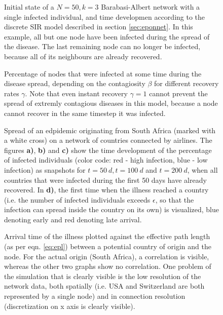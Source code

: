 \documentclass{scrartcl}
\begin{document}
\begin{figure}
    \centering
    \def\svgwidth{0.9\textwidth}
    
    \caption{Initial state of a $N=50, k=3$ Barabasi-Albert network with a single infected individual, and time developmen according to the discrete SIR model described in section \ref{sec:eponnet}. In this example, all but one node have been infected during the spread of the disease. The last remaining node can no longer be infected, because all of its neighbours are already recovered.}
    \label{fig:D11}
\end{figure}

\begin{figure}
    \centering
    \caption{Percentage of nodes that were infected at some time during the disease spread, 
		depending on the contagiosity $\beta$ for different recovery rates $\gamma$. Note that 
		even instant recovery $\gamma=1$ cannot prevent the spread of extremly contagious diseases
		in this model, because a node cannot recover in the same timestep it was infected.}
    \label{fig:D12}
\end{figure}

\begin{figure}
    \centering
    \def\svgwidth{1.0\textwidth}
    
    \caption{Spread of an edpidemic originating from South Africa (marked with a white cross) on a network of countries connected by airlines. The figures \textbf{a)}, \textbf{b)} and \textbf{c)} show the time development of the percentage of infected individuals (color code: red - high infection, blue - low infection) as snapshots for $t=\SI{50}{d}, t=\SI{100}{d}$ and $t=\SI{200}{d}$, when all countries that were infected during the first 50 days have already recovered.
		In \textbf{d)}, the first time when the illness reached a country (i.e. the number of infected individuals exceeds $\epsilon$, so that the infection can spread inside the country on its own) is visualized, blue denoting early and red denoting late arrival. }
    \label{fig:D1spread}
\end{figure}

\begin{figure}
    \centering
    \caption{Arrival time of the illness plotted against the effective path length  (as per eqn. \ref{eq:epl}) between 
		a potential country of origin and the node. For the actual origin (South Africa), a correlation is visible, whereas the other two graphs show no correlation. One problem of the simulation that is clearly visible is the low resolution of the network data, both spatially (i.e. USA and Switzerland are both represented by a single node) and in connection resolution (discretization on x axis is clearly visible).}
    \label{fig:arrival}
\end{figure}
\end{document}
